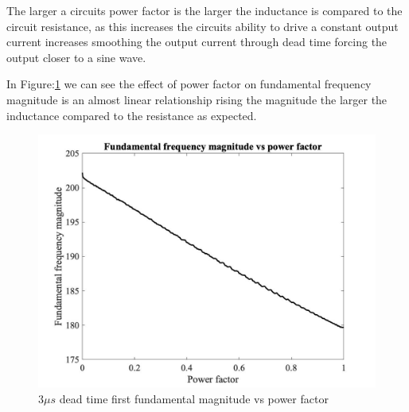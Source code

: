 \documentclass{article}
\begin{document}
The larger a circuits power factor is the larger the inductance is compared to the circuit resistance, as this increases the circuits ability to drive a constant output current increases smoothing the output current through dead time forcing the output closer to a sine wave.

In Figure:\ref{fig:deadTimePF} we can see the effect of power factor on fundamental frequency magnitude is an almost linear relationship rising the magnitude the larger the inductance compared to the resistance as expected.  


\begin{figure}
    \centering
    \includegraphics[scale=0.2]{2c3.jpg}
    \caption{$3\mu s$ dead time first fundamental magnitude vs power factor}
    \label{fig:deadTimePF}
\end{figure}




\end{document}

